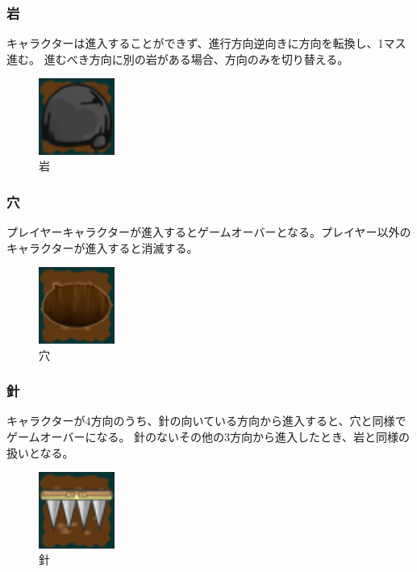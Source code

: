 \subsubsection{岩}
キャラクターは進入することができず、進行方向逆向きに方向を転換し、1マス進む。
進むべき方向に別の岩がある場合、方向のみを切り替える。

\begin{figure}[htbp]
  \begin{center}
    \includegraphics[bb=0 0 24 24, width=2.5cm]{images/rock.png}
  \end{center}
  \caption{岩}
  \label{fig:one}
\end{figure}

\subsubsection{穴}
プレイヤーキャラクターが進入するとゲームオーバーとなる。プレイヤー以外のキャラクターが進入すると消滅する。

\begin{figure}[htbp]
  \begin{center}
    \includegraphics[bb=0 0 24 24, width=2.5cm]{images/hole.png}
  \end{center}
  \caption{穴}
  \label{fig:one}
\end{figure}

\subsubsection{針}
キャラクターが4方向のうち、針の向いている方向から進入すると、穴と同様でゲームオーバーになる。
針のないその他の3方向から進入したとき、岩と同様の扱いとなる。

\begin{figure}[htbp]
  \begin{center}
    \includegraphics[bb=0 0 24 24, width=2.5cm]{images/needle.png}
  \end{center}
  \caption{針}
  \label{fig:one}
\end{figure}

